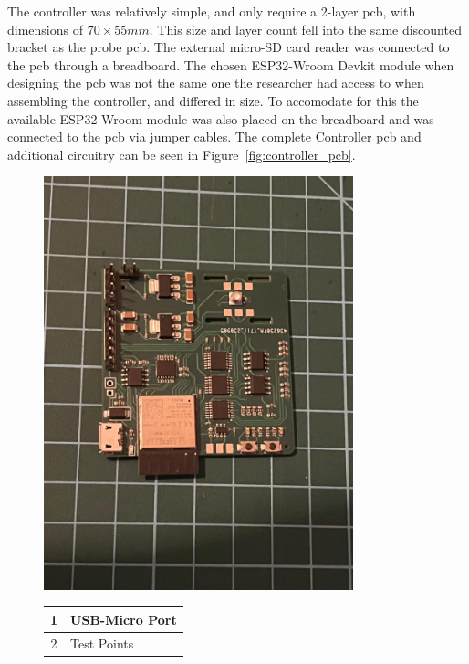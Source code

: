 The controller was relatively simple, and only require a 2-layer \gls{pcb}, with dimensions of $70\times55mm$.
This size and layer count fell into the same discounted bracket as the probe \gls{pcb}.
The external micro-SD card reader was connected to the \gls{pcb} through a breadboard.
The chosen ESP32-Wroom Devkit module when designing the \gls{pcb} was not the same one the researcher had access to when assembling the controller, and differed in size.
To accomodate for this the available ESP32-Wroom module was also placed on the breadboard and was connected to the \gls{pcb} via jumper cables.
The complete Controller \gls{pcb} and additional circuitry can be seen in Figure~\ref{fig:controller_pcb}.

\begin{figure}[ht] %
    \begin{minipage}{0.5\textwidth}
        \centering
        \includegraphics[width=0.8\textwidth]{Figures/probe_pcb.jpg}
    \end{minipage}
    \begin{minipage}{0.5\textwidth}
        \centering
        \begin{tabular}{cl} \hline
            1 & USB-Micro Port \\ \hline
            2 & Test Points \\ \hline

\end{tabular}
\end{minipage}
\end{figure}
